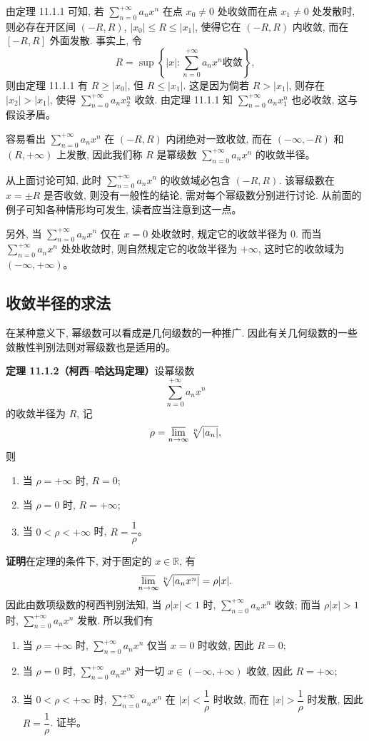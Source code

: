 \documentclass[UTF8, 12pt, fontset=fandol, oneside]{ctexart}
\begin{document}
由定理 11.1.1 可知, 若 $\sum_{n=0}^{+\infty}a_nx^n$ 在点 $x_0\ne0$ 处收敛而在点 $x_1\ne0$ 处发散时, 则必存在开区间 $(-R,R)$, $|x_0|\leqslant R\leqslant |x_1|$, 使得它在 $(-R,R)$ 内收敛, 而在 $[-R,R]$ 外面发散. 事实上, 令
\[
  R=\sup\left\{|x|:\sum_{n=0}^{+\infty}a_nx^n\text{收敛}\right\},
\]
则由定理 11.1.1 有 $R\geqslant |x_0|$, 但 $R\leqslant |x_1|$. 这是因为倘若 $R>|x_1|$, 则存在 $|x_2|>|x_1|$, 使得 $\sum_{n=0}^{+\infty}a_nx_2^n$ 收敛. 由定理 11.1.1 知 $\sum_{n=0}^{+\infty}a_nx_1^n$ 也必收敛, 这与假设矛盾。

容易看出 $\sum_{n=0}^{+\infty}a_nx^n$ 在 $(-R,R)$ 内闭绝对一致收敛, 而在 $(-\infty,-R)$ 和 $(R,+\infty)$ 上发散, 因此我们称 $R$ 是幂级数 $\sum_{n=0}^{+\infty}a_nx^n$ 的收敛半径。

从上面讨论可知, 此时 $\sum_{n=0}^{+\infty}a_nx^n$ 的收敛域必包含 $(-R,R)$. 该幂级数在 $x=\pm R$ 是否收敛, 则没有一般性的结论, 需对每个幂级数分别进行讨论. 从前面的例子可知各种情形均可发生, 读者应当注意到这一点。

另外, 当 $\sum_{n=0}^{+\infty}a_nx^n$ 仅在 $x=0$ 处收敛时, 规定它的收敛半径为 $0$. 而当 $\sum_{n=0}^{+\infty}a_nx^n$ 处处收敛时, 则自然规定它的收敛半径为 $+\infty$, 这时它的收敛域为 $(-\infty,+\infty)$。

\subsection{收敛半径的求法}

在某种意义下, 幂级数可以看成是几何级数的一种推广. 因此有关几何级数的一些敛散性判别法则对幂级数也是适用的。

\noindent\textbf{定理 11.1.2（柯西--哈达玛定理）}\quad 设幂级数
\[
  \sum_{n=0}^{+\infty}a_nx^n
\]
的收敛半径为 $R$, 记
\[
  \rho=\varlimsup_{n\to\infty}\sqrt[n]{|a_n|},
\]
则
\begin{enumerate}
  \item 当 $\rho=+\infty$ 时, $R=0$;
  \item 当 $\rho=0$ 时, $R=+\infty$;
  \item 当 $0<\rho<+\infty$ 时, $R=\dfrac1\rho$。
\end{enumerate}

\noindent\textbf{证明}\quad 在定理的条件下, 对于固定的 $x\in\mathbb R$, 有
\[
  \varlimsup_{n\to\infty}\sqrt[n]{|a_nx^n|}
  =
  \rho|x|.
\]
因此由数项级数的柯西判别法知, 当 $\rho|x|<1$ 时, $\sum_{n=0}^{+\infty}a_nx^n$ 收敛; 而当 $\rho|x|>1$ 时, $\sum_{n=0}^{+\infty}a_nx^n$ 发散. 所以我们有
\begin{enumerate}
  \item 当 $\rho=+\infty$ 时, $\sum_{n=0}^{+\infty}a_nx^n$ 仅当 $x=0$ 时收敛, 因此 $R=0$;
  \item 当 $\rho=0$ 时, $\sum_{n=0}^{+\infty}a_nx^n$ 对一切 $x\in(-\infty,+\infty)$ 收敛, 因此 $R=+\infty$;
  \item 当 $0<\rho<+\infty$ 时, $\sum_{n=0}^{+\infty}a_nx^n$ 在 $|x|<\dfrac1\rho$ 时收敛, 而在 $|x|>\dfrac1\rho$ 时发散, 因此 $R=\dfrac1\rho$. 证毕。
\end{enumerate}
\end{document}
